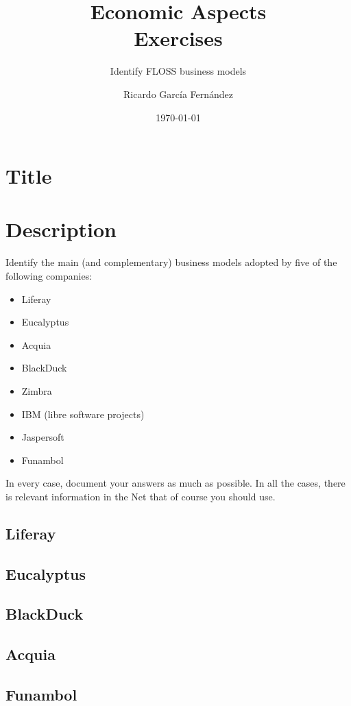 \documentclass[11pt]{scrartcl}
\title{\textbf{Economic Aspects\\
                Exercises}}
\subtitle{Identify FLOSS business models}
\author{Ricardo Garc\'ia Fern\'andez}
\date{\today}
\begin{document}
\maketitle

\section{Title}

\section{Description}

Identify the main (and complementary) business models adopted by five of the following companies:

\begin{itemize}
  \item Liferay
  \item Eucalyptus
  \item Acquia
  \item BlackDuck
  \item Zimbra
  \item IBM (libre software projects)
  \item Jaspersoft
  \item Funambol
\end{itemize}

In every case, document your answers as much as possible. In all the cases, there is relevant information in the Net that of course you should use.

\subsection{Liferay}



\subsection{Eucalyptus}

\subsection{BlackDuck}

\subsection{Acquia}

\subsection{Funambol}
\end{document}
